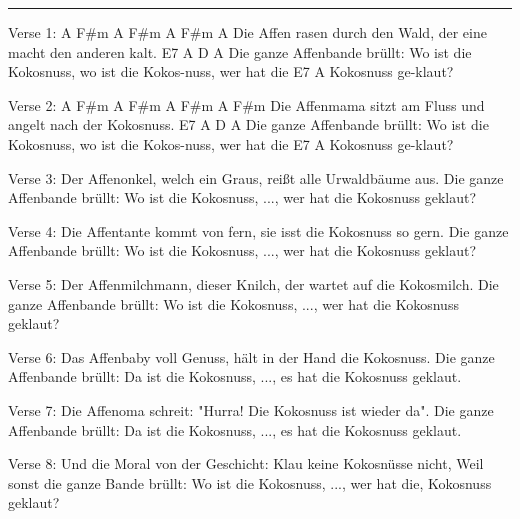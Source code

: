 \noindent\rule{\columnwidth}{1pt}

\begin{lstsong}
Verse 1:
    A      F#m   A        F#m        A   F#m        A
Die Affen rasen durch den Wald, der eine macht den anderen kalt.
          E7         A                  D                     A
Die ganze Affenbande brüllt: Wo ist die Kokosnuss, wo ist die Kokos-nuss, wer hat die 
E7           A
Kokosnuss ge-klaut?

Verse 2:
    A    F#m   A        F#m        A    F#m      A    F#m
Die Affenmama sitzt am Fluss und angelt nach der Kokosnuss.
          E7          A                  D                     A
Die ganze Affenbande brüllt: Wo ist die Kokosnuss, wo ist die Kokos-nuss, wer hat die 
E7           A
Kokosnuss ge-klaut?

Verse 3:
Der Affenonkel, welch ein Graus, reißt alle Urwaldbäume aus.
Die ganze Affenbande brüllt: Wo ist die Kokosnuss, ..., wer hat die Kokosnuss geklaut?

Verse 4:
Die Affentante kommt von fern, sie isst die Kokosnuss so gern.
Die ganze Affenbande brüllt: Wo ist die Kokosnuss, ..., wer hat die Kokosnuss geklaut?

Verse 5:
Der Affenmilchmann, dieser Knilch, der wartet auf die Kokosmilch.
Die ganze Affenbande brüllt: Wo ist die Kokosnuss, ..., wer hat die Kokosnuss geklaut?

Verse 6:
Das Affenbaby voll Genuss, hält in der Hand die Kokosnuss.
Die ganze Affenbande brüllt: Da ist die Kokosnuss, ..., es hat die Kokosnuss geklaut.

Verse 7:
Die Affenoma schreit: "Hurra! Die Kokosnuss ist wieder da".
Die ganze Affenbande brüllt: Da ist die Kokosnuss, ..., es hat die Kokosnuss geklaut.

Verse 8:
Und die Moral von der Geschicht: Klau keine Kokosnüsse nicht,
Weil sonst die ganze Bande brüllt: Wo ist die Kokosnuss, ..., wer hat die, Kokosnuss geklaut?
\end{lstsong}
\newpage
